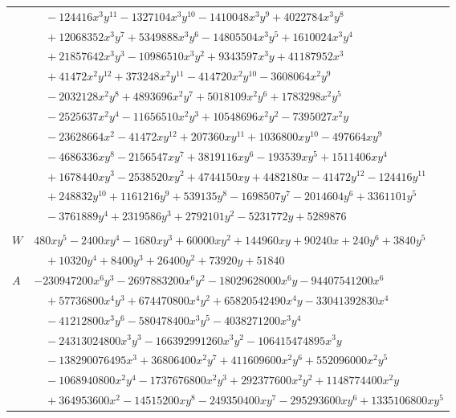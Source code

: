 \documentclass[11pt]{article}
\begin{document}
\begin{longtable}{@{}ll@{}}
 & $\quad -124416x^{3}y^{11}-1327104x^{3}y^{10}-1410048x^{3}y^{9}+4022784x^{3}y^{8}$\\
 & $\quad +12068352x^{3}y^{7}+5349888x^{3}y^{6}-14805504x^{3}y^{5}+1610024x^{3}y^{4}$\\
 & $\quad +21857642x^{3}y^{3}-10986510x^{3}y^{2}+9343597x^{3}y+41187952x^{3}$\\
 & $\quad +41472x^{2}y^{12}+373248x^{2}y^{11}-414720x^{2}y^{10}-3608064x^{2}y^{9}$\\
 & $\quad -2032128x^{2}y^{8}+4893696x^{2}y^{7}+5018109x^{2}y^{6}+1783298x^{2}y^{5}$\\
 & $\quad -2525637x^{2}y^{4}-11656510x^{2}y^{3}+10548696x^{2}y^{2}-7395027x^{2}y$\\
 & $\quad -23628664x^{2}-41472xy^{12}+207360xy^{11}+1036800xy^{10}-497664xy^{9}$\\
 & $\quad -4686336xy^{8}-2156547xy^{7}+3819116xy^{6}-193539xy^{5}+1511406xy^{4}$\\
 & $\quad +1678440xy^{3}-2538520xy^{2}+4744150xy+4482180x-41472y^{12}-124416y^{11}$\\
 & $\quad +248832y^{10}+1161216y^{9}+539135y^{8}-1698507y^{7}-2014604y^{6}+3361101y^{5}$\\
 & $\quad -3761889y^{4}+2319586y^{3}+2792101y^{2}-5231772y+5289876$\\
\addlinespace[3pt]
\multicolumn{2}{@{}l}{$i=6$, $m=720$, neighbours $0,37,54,130,149,177,183,213,224$}\\
$W$ & $480xy^{5}-2400xy^{4}-1680xy^{3}+60000xy^{2}+144960xy+90240x+240y^{6}+3840y^{5}$\\
 & $\quad +10320y^{4}+8400y^{3}+26400y^{2}+73920y+51840$\\
$A$ & $-230947200x^{6}y^{3}-2697883200x^{6}y^{2}-18029628000x^{6}y-94407541200x^{6}$\\
 & $\quad +57736800x^{4}y^{3}+674470800x^{4}y^{2}+65820542490x^{4}y-33041392830x^{4}$\\
 & $\quad -41212800x^{3}y^{6}-580478400x^{3}y^{5}-4038271200x^{3}y^{4}$\\
 & $\quad -24313024800x^{3}y^{3}-166392991260x^{3}y^{2}-106415474895x^{3}y$\\
 & $\quad -138290076495x^{3}+36806400x^{2}y^{7}+411609600x^{2}y^{6}+552096000x^{2}y^{5}$\\
 & $\quad -1068940800x^{2}y^{4}-1737676800x^{2}y^{3}+292377600x^{2}y^{2}+1148774400x^{2}y$\\
 & $\quad +364953600x^{2}-14515200xy^{8}-249350400xy^{7}-295293600xy^{6}+1335106800xy^{5}$\\

\end{longtable}
\end{document}
